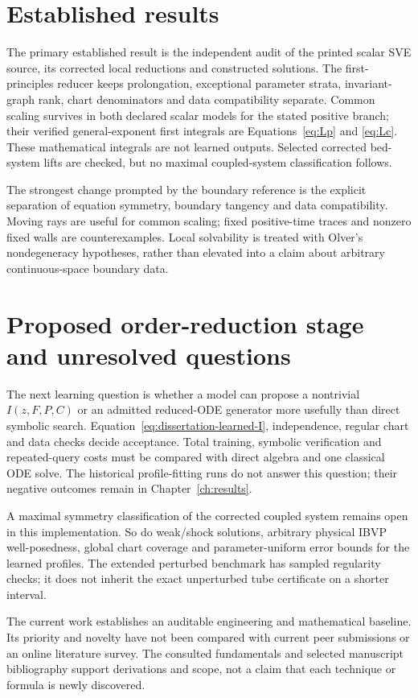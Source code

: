 \documentclass[12pt,a4paper,oneside]{report}
\numberwithin{equation}{chapter}
\begin{document}
\section{Established results}
The primary established result is the independent audit of the printed
scalar SVE source, its corrected local reductions and constructed solutions.
The first-principles reducer keeps prolongation, exceptional parameter
strata, invariant-graph rank, chart denominators and data compatibility
separate. Common scaling survives in both declared scalar models for the
stated positive branch; their verified general-exponent first integrals are
Equations~\eqref{eq:Lp} and \eqref{eq:Lc}. These mathematical integrals are
not learned outputs. Selected corrected bed-system lifts are checked, but
no maximal coupled-system classification follows.

The strongest change prompted by the boundary reference is the explicit
separation of equation symmetry, boundary tangency and data compatibility.
Moving rays are useful for common scaling; fixed positive-time traces and
nonzero fixed walls are counterexamples. Local solvability is treated with
Olver's nondegeneracy hypotheses, rather than elevated into a claim about
arbitrary continuous-space boundary data.

\section{Proposed order-reduction stage and unresolved questions}
The next learning question is whether a model can propose a nontrivial
$I(z,F,P,C)$ or an admitted reduced-ODE generator more usefully than direct
symbolic search. Equation~\eqref{eq:dissertation-learned-I}, independence,
regular chart and data checks decide acceptance. Total training, symbolic
verification and repeated-query costs must be compared with direct algebra
and one classical ODE solve. The historical profile-fitting runs do not
answer this question; their negative outcomes remain in Chapter~\ref{ch:results}.

A maximal symmetry classification of the corrected coupled system remains
open in this implementation. So do weak/shock solutions, arbitrary physical
IBVP well-posedness, global chart coverage and parameter-uniform error bounds
for the learned profiles. The extended perturbed benchmark has sampled
regularity checks; it does not inherit the exact unperturbed tube certificate
on a shorter interval.

The current work establishes an auditable engineering and mathematical
baseline. Its priority and novelty have not been compared with current peer
submissions or an online literature survey. The consulted fundamentals and
selected manuscript bibliography support derivations and scope, not a claim
that each technique or formula is newly discovered.
\end{document}
